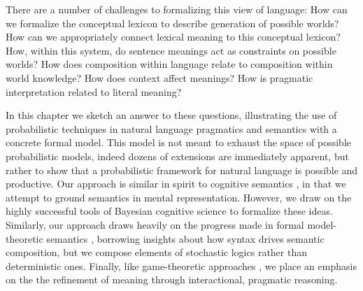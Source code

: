 \documentclass[pdfextras]{handbook}
\begin{document}
There are a number of challenges to formalizing this view of language: How can we formalize the conceptual lexicon to describe generation of possible worlds? How can we appropriately connect lexical meaning to this conceptual lexicon? How, within this system, do sentence meanings act as constraints on possible worlds? How does composition within language relate to composition within world knowledge?  How does context affect meanings? How is pragmatic interpretation related to literal meaning?



In this chapter we sketch an answer to these questions, illustrating the use of probabilistic techniques in natural language pragmatics and semantics with a concrete formal model. This model is not meant to exhaust the space of possible probabilistic models, indeed dozens of extensions are immediately apparent, but rather to show that a probabilistic framework for natural language is possible and productive.
Our approach is similar in spirit to cognitive semantics \citep{jackendoff1983semantics,lakoff1987women}, in that we attempt to ground semantics in mental representation. However, we draw on the highly successful tools of Bayesian cognitive science to formalize these ideas. 
Similarly, our approach draws heavily on the progress made in formal model-theoretic semantics \citep{lewis70,montague1973,gamut91,heimkratzer1998}, borrowing insights about how syntax drives semantic composition, but we compose elements of stochastic logics rather than deterministic ones.
Finally, like game-theoretic approaches \citep{benz,vanrooij,jaeger}, we place an emphasis on the the refinement of meaning through interactional, pragmatic reasoning.
\end{document}
